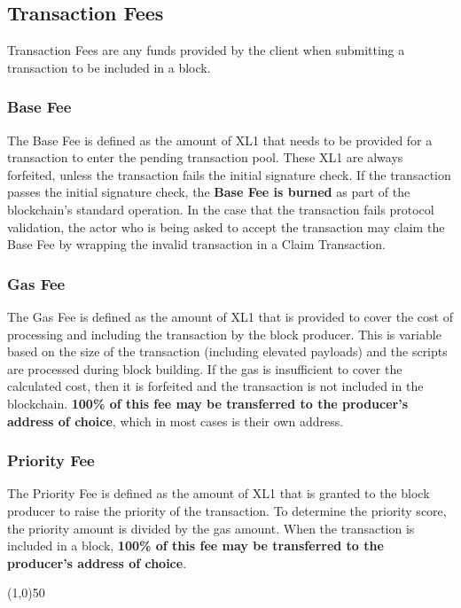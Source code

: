\documentclass{article}
\begin{document}
\subsection{Transaction Fees}
Transaction Fees are any funds provided by the client when submitting a transaction to be included in a block.

\subsubsection{Base Fee}
The Base Fee is defined as the amount of XL1 that needs to be provided for a transaction to enter the pending transaction pool. These XL1 are always forfeited, unless the transaction fails the initial signature check. If the transaction passes the initial signature check, the \textbf{Base Fee is burned} as part of the blockchain's standard operation. In the case that the transaction fails protocol validation, the actor who is being asked to accept the transaction may claim the Base Fee by wrapping the invalid transaction in a Claim Transaction. 

\subsubsection{Gas Fee}
The Gas Fee is defined as the amount of XL1 that is provided to cover the cost of processing and including the transaction by the block producer. This is variable based on the size of the transaction (including elevated payloads) and the scripts are processed during block building. If the gas is insufficient to cover the calculated cost, then it is forfeited and the transaction is not included in the blockchain. \textbf{100\% of this fee may be transferred to the producer's address of choice}, which in most cases is their own address. 


\subsubsection{Priority Fee}
The Priority Fee is defined as the amount of XL1 that is granted to the block producer to raise the priority of the transaction. To determine the priority score, the priority amount is divided by the gas amount. When the transaction is included in a block, \textbf{100\% of this fee may be transferred to the producer's address of choice}.

\begin{center}
\line(1,0){50}
\end{center}
\end{document}
